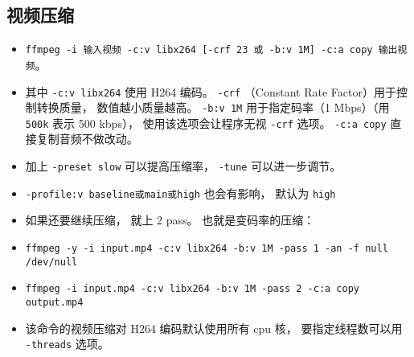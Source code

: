 \subsection{视频压缩}
\begin{itemize}
\item \verb|ffmpeg -i 输入视频 -c:v libx264 [-crf 23 或 -b:v 1M] -c:a copy 输出视频|。
\item 其中 \verb|-c:v libx264| 使用 H264 编码。 \verb|-crf| （Constant Rate Factor）用于控制转换质量， 数值越小质量越高。 \verb|-b:v 1M| 用于指定码率（1 Mbps）（用 \verb|500k| 表示 500 kbps）， 使用该选项会让程序无视 \verb|-crf| 选项。 \verb|-c:a copy| 直接复制音频不做改动。
\item 加上 \verb|-preset slow| 可以提高压缩率， \verb|-tune| 可以进一步调节。
\item \verb|-profile:v baseline或main或high| 也会有影响， 默认为 \verb|high|
\item 如果还要继续压缩， 就上 2 pass。 也就是变码率的压缩：
\item \verb|ffmpeg -y -i input.mp4 -c:v libx264 -b:v 1M -pass 1 -an -f null /dev/null|
\item \verb|ffmpeg -i input.mp4 -c:v libx264 -b:v 1M -pass 2 -c:a copy output.mp4|
\item 该命令的视频压缩对 H264 编码默认使用所有 cpu 核， 要指定线程数可以用 \verb|-threads| 选项。
\end{itemize}

